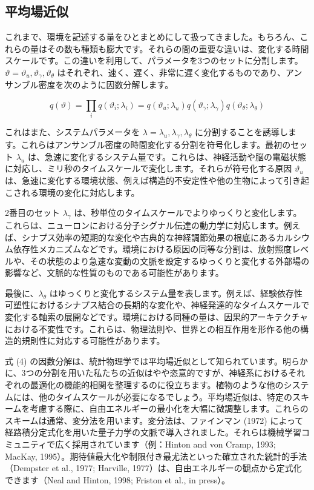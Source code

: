\documentclass{article}
\begin{document}
\subsection{平均場近似}
これまで、環境を記述する量をひとまとめにして扱ってきました。もちろん、これらの量はその数も種類も膨大です。それらの間の重要な違いは、変化する時間スケールです。この違いを利用して、パラメータを3つのセットに分割します。$\vartheta = \vartheta_u, \vartheta_\gamma, \vartheta_\theta$ はそれぞれ、速く、遅く、非常に遅く変化するものであり、アンサンブル密度を次のように因数分解します。

$$q(\vartheta)=\prod_i q(\vartheta_i;\lambda_i)=q(\vartheta_u;\lambda_u)q(\vartheta_\gamma;\lambda_\gamma)q(\vartheta_\theta;\lambda_\theta)$$

これはまた、システムパラメータを $\lambda = \lambda_u, \lambda_\gamma, \lambda_\theta$ に分割することを誘導します。これらはアンサンブル密度の時間変化する分割を符号化します。最初のセット $\lambda_u$ は、急速に変化するシステム量です。これらは、神経活動や脳の電磁状態に対応し、ミリ秒のタイムスケールで変化します。それらが符号化する原因 $\vartheta_u$ は、急速に変化する環境状態、例えば構造的不安定性や他の生物によって引き起こされる環境の変化に対応します。

2番目のセット $\lambda_\gamma$ は、秒単位のタイムスケールでよりゆっくりと変化します。これらは、ニューロンにおける分子シグナル伝達の動力学に対応します。例えば、シナプス効率の短期的な変化や古典的な神経調節効果の根底にあるカルシウム依存性メカニズムなどです。環境における原因の同等な分割は、放射照度レベルや、その状態のより急速な変動の文脈を設定するゆっくりと変化する外部場の影響など、文脈的な性質のものである可能性があります。

最後に、$\lambda_\theta$ はゆっくりと変化するシステム量を表します。例えば、経験依存性可塑性におけるシナプス結合の長期的な変化や、神経発達的なタイムスケールで変化する軸索の展開などです。環境における同種の量は、因果的アーキテクチャにおける不変性です。これらは、物理法則や、世界との相互作用を形作る他の構造的規則性に対応する可能性があります。

式 (4) の因数分解は、統計物理学では平均場近似として知られています。明らかに、3つの分割を用いた私たちの近似はやや恣意的ですが、神経系におけるそれぞれの最適化の機能的相関を整理するのに役立ちます。植物のような他のシステムには、他のタイムスケールが必要になるでしょう。平均場近似は、特定のスキームを考慮する際に、自由エネルギーの最小化を大幅に微調整します。これらのスキームは通常、変分法を用います。変分法は、ファインマン (1972) によって経路積分定式化を用いた量子力学の文脈で導入されました。それらは機械学習コミュニティで広く採用されています（例：Hinton and von Cramp, 1993; MacKay, 1995）。期待値最大化や制限付き最尤法といった確立された統計的手法（Dempster et al., 1977; Harville, 1977）は、自由エネルギーの観点から定式化できます（Neal and Hinton, 1998; Friston et al., in press）。
\end{document}
